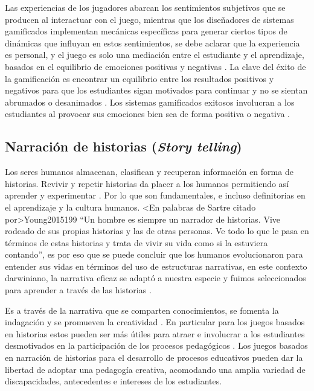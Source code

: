 Las experiencias de los jugadores abarcan los sentimientos subjetivos que se producen al interactuar con
el juego, mientras que los diseñadores de sistemas gamificados implementan mecánicas específicas para generar
ciertos tipos de dinámicas que influyan en estos sentimientos, se debe aclarar que la experiencia es personal,
y el juego es solo una mediación entre el estudiante y el aprendizaje, basados en el equilibrio de emociones
positivas y negativas \cite{PRESTOPNIK2015492}. La clave del éxito de la gamificación es encontrar un
equilibrio entre los resultados positivos y negativos para que los estudiantes sigan motivados para continuar y no
se sientan abrumados o desanimados \cite{8190501}. Los sistemas gamificados exitosos involucran a los
estudiantes al provocar sus emociones bien sea de forma positiva o negativa \cite{MULLINS2020304}.

\subsection{Narración de historias (\textit{Story telling})}

Los seres humanos almacenan, clasifican y recuperan información en forma de historias. Revivir y repetir
historias da placer a los humanos permitiendo así aprender y experimentar \cite{Brieger2013ExploringNC}. Por
lo que son fundamentales, e incluso definitorias en el aprendizaje y la cultura humanos. \citeA<En palabras de
Sartre citado por>{Young2015199} ``Un hombre es siempre un narrador de historias. Vive rodeado de sus propias
historias y las de otras personas. Ve todo lo que le pasa en términos de estas historias y trata de vivir su
vida como si la estuviera contando'', es por eso que se puede concluir que los humanos evolucionaron para 
entender sus vidas en términos del uso de estructuras narrativas, en este contexto darwiniano, la narrativa
eficaz se adaptó a nuestra especie y fuimos seleccionados para aprender a través de las historias
\cite{Young2015199}.

Es a través de la narrativa que se comparten conocimientos, se fomenta la indagación y se promueven la 
creatividad \cite{Young2015199}. En particular para los juegos basados en historias estos pueden ser más
útiles para atraer e involucrar a los estudiantes desmotivados en la participación de los procesos pedagógicos
\cite{PRESTOPNIK2015492}. Los juegos basados en narración de historias para el desarrollo de procesos 
educativos pueden dar la libertad de adoptar una pedagogía creativa, acomodando una amplia variedad de 
discapacidades, antecedentes e intereses de los estudiantes.

